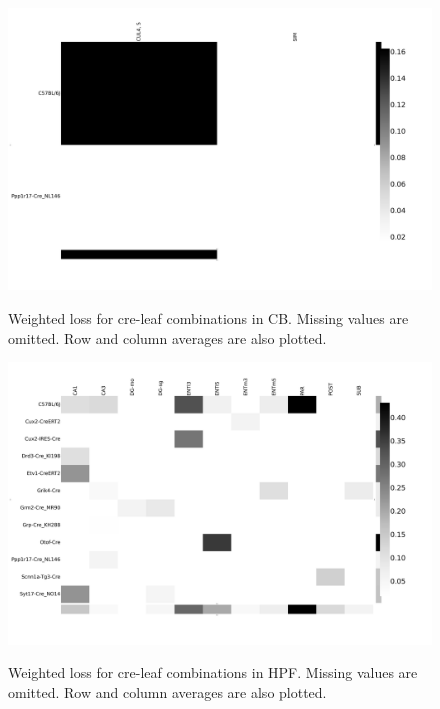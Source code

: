 \begin{figure}[H]
    \centering
    \includegraphics[width = 7in]{figs/lossdetails_512.png} 
    \label{fig:distances}
    \caption{Weighted loss for cre-leaf combinations in CB.  Missing values are omitted.   Row and column averages are also plotted.}
\end{figure}


\begin{figure}[H]
    \centering
    \includegraphics[width = 7in]{figs/lossdetails_1089.png} 
    \label{fig:distances}
    \caption{Weighted loss for cre-leaf combinations in HPF. Missing values are omitted.   Row and column averages are also plotted.}
\end{figure}

